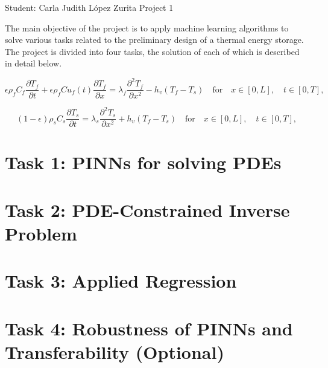 \documentclass[unicode,11pt,a4paper,oneside,numbers=endperiod,openany]{scrartcl}
\begin{document}
\setassignment
{}

            {Student: Carla Judith L\'opez Zurita}
            {}{Project 1}{}
\newline

The main objective of the project is to apply machine learning algorithms to solve various tasks
related to the preliminary design of a thermal energy storage.
The project is divided into four tasks, the solution of each of which is
described in detail below.


\begin{equation}
    \epsilon \rho_f C_f \frac{\partial T_f}{\partial t} + \epsilon \rho_f C u_f(t) \frac{\partial T_f}{\partial x} = \lambda_f \frac{\partial^2 T_f}{\partial x^2} - h_v(T_f - T_s) \quad \text{for} \quad x \in [0, L], \quad t \in [0, T],
\end{equation}

\begin{equation}
    (1 - \epsilon) \rho_s C_s \frac{\partial T_s}{\partial t} = \lambda_s \frac{\partial^2 T_s}{\partial x^2} + h_v(T_f - T_s) \quad \text{for} \quad x \in [0, L], \quad t \in [0, T],
\end{equation}

\section{Task 1:  PINNs for solving PDEs}

\section{Task 2: PDE-Constrained Inverse Problem}

\section{Task 3: Applied Regression}

\section{Task 4: Robustness of PINNs and Transferability (Optional)}
\end{document}
